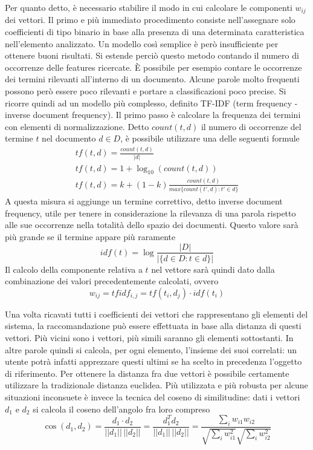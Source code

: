 \documentclass[Lau,binding=0.6cm,noexaminfo,oneside]{sapthesis}
\begin{document}
Per quanto detto, è necessario stabilire il modo in cui calcolare le componenti $w_{ij}$ dei vettori. Il primo e più immediato procedimento consiste nell'assegnare solo coefficienti di tipo binario in base alla presenza di una determinata caratteristica nell'elemento analizzato. Un modello così semplice è però insufficiente per ottenere buoni risultati. Si estende perciò questo metodo contando il numero di occorrenze delle features ricercate.
\MakeUppercase{è} possibile per esempio contare le occorrenze dei termini rilevanti all'interno di un documento. Alcune parole molto frequenti possono però essere poco rilevanti e portare a classificazioni poco precise. Si ricorre quindi ad un modello più complesso, definito TF-IDF (term frequency - inverse document frequency). Il primo passo è calcolare la frequenza dei termini con elementi di normalizzazione. Detto $count(t,d)$ il numero di occorrenze del termine $t$ nel documento $d \in D$, è possibile utilizzare una delle seguenti formule
\begin{gather*}
  t\!f(t,d) = \frac{count(t,d)}{|d|} \\
  t\!f(t,d) = 1 + \log_{10}(count(t,d)) \\
  t\!f(t,d) = k + (1-k) \frac{count(t,d)}{max\{count(t',d) : t' \in d\}}
\end{gather*}
A questa misura si aggiunge un termine correttivo, detto inverse document frequency, utile per tenere in considerazione la rilevanza di una parola rispetto alle sue occorrenze nella totalità dello spazio dei documenti. Questo valore sarà più grande se il termine appare più raramente
\[
idf(t) = \log \frac{|D|}{|\{d \in D : t \in d\}|}
\]
Il calcolo della componente relativa a $t$ nel vettore sarà quindi dato dalla combinazione dei valori precedentemente calcolati, ovvero
\[
w_{ij} = t\!fidf_{i,j} = t\!f(t_i,d_j) \cdot idf(t_i)
\]

\medskip

Una volta ricavati tutti i coefficienti dei vettori che rappresentano gli elementi del sistema, la raccomandazione può essere effettuata in base alla distanza di questi vettori. Più vicini sono i vettori, più simili saranno gli elementi sottostanti. In altre parole quindi si calcola, per ogni elemento, l'insieme dei suoi correlati: un utente potrà infatti apprezzare questi ultimi se ha scelto in precedenza l'oggetto di riferimento. Per ottenere la distanza fra due vettori è possibile certamente utilizzare la tradizionale distanza euclidea. Più utilizzata e più robusta per alcune situazioni inconsuete è invece la tecnica del coseno di similitudine: dati i vettori $d_1$ e $d_2$ si calcola il coseno dell'angolo fra loro compreso
\[
\cos(d_1, d_2) = \frac{d_1 \cdot d_2}{||d_1|| \, ||d_2||} = \frac{d_1^T d_2}{||d_1|| \, ||d_2||} = \frac{\sum_{i} w_{i1} w_{i2}}{\sqrt{\sum_{i} w_{i1}^2} \sqrt{\sum_{i} w_{i2}^2}}
\]
\end{document}
